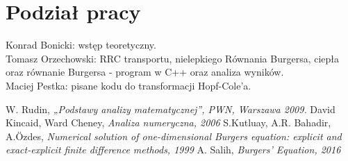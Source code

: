 \documentclass[a4paper,12pt]{article}
\begin{document}
\section*{Podział pracy}
Konrad Bonicki: wstęp teoretyczny. \\ 
Tomasz Orzechowski: RRC transportu, nielepkiego Równania Burgersa, ciepła oraz równanie Burgersa - program w C++ oraz analiza wyników.\\
Maciej Pestka: pisane kodu do transformacji Hopf-Cole'a.

\begin{thebibliography}{9}
 W. Rudin, \textit{„Podstawy analizy matematycznej”, PWN, Warszawa 2009.}
 David Kincaid, Ward Cheney,    \textit{ Analiza numeryczna, 2006}
 S.Kutluay, A.R. Bahadir, A.Özdes, \textit{Numerical solution of one-dimensional Burgers equation: explicit and exact-explicit finite difference methods, 1999}
 A. Salih, \textit{ Burgers’ Equation, 2016}
\end{thebibliography}
\end{document}

